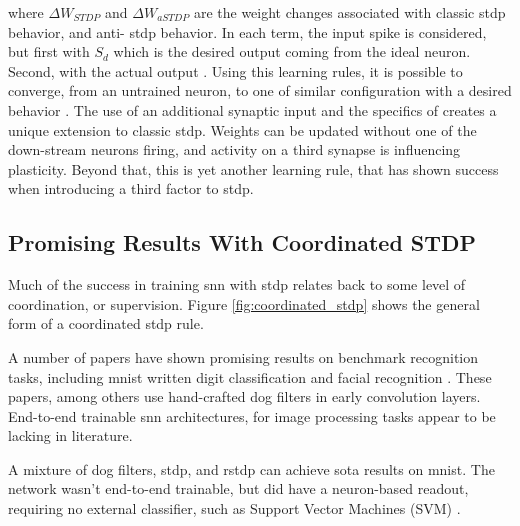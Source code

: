     \noindent where $\Delta W_{STDP}$ and $\Delta W_{aSTDP}$ are the weight
    changes associated with classic \gls{stdp} behavior, and anti- \gls{stdp}
    behavior. In each term, the input spike is considered, but first with
    $S_{d}$ which is the desired output coming from the ideal neuron. Second,
    with the actual output \parencite{mozafari_2018}. Using this learning rules,
    it is possible to converge, from an untrained neuron, to one of similar
    configuration with a desired behavior \parencite{ponulak_2010}. The use of
    an additional synaptic input and the specifics of 
    creates a unique extension to classic \gls{stdp}. Weights can be updated
    without one of the down-stream neurons firing, and activity on a third
    synapse is influencing plasticity. Beyond that, this is yet another learning
    rule, that has shown success when introducing a third factor to \gls{stdp}.



    \subsection{Promising Results With Coordinated STDP}
    Much of the success in training \gls{snn} with \gls{stdp} relates back to
    some level of coordination, or supervision. Figure
    \ref{fig:coordinated_stdp} shows the general form of a coordinated
    \gls{stdp} rule.

    
    A number of papers have shown promising results on benchmark
    recognition tasks, including \gls{mnist} written digit classification
    \parencite{mozafari_2018} and facial recognition
    \parencite{delorme_2001}. These papers, among others use hand-crafted
    \gls{dog} filters in early convolution layers. End-to-end
    trainable \gls{snn} architectures, for image processing tasks appear to be
    lacking in literature.
    
    A mixture of \gls{dog} filters, \gls{stdp}, and \gls{rstdp} can achieve
    \acrshort{sota} results on \gls{mnist}. The network wasn't end-to-end
    trainable, but did have a neuron-based readout, requiring no external
    classifier, such as Support Vector Machines (SVM) \parencite{mozafari_2018}.
    
